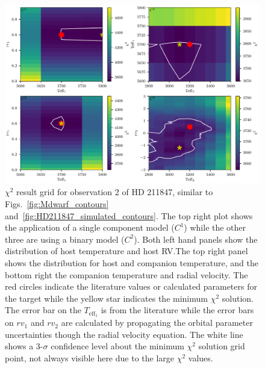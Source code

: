 \documentclass[fleqn,usenatbib]{mnras}
\begin{document}
\begin{figure}
    \centering
    \includegraphics[width=0.8\hsize]{images/fig5.pdf}
    \caption{\(\chi^2\) result grid for observation 2 of {HD 211847}, similar to Figs.~\ref{fig:Mdwarf_contours} and~\ref{fig:HD211847_simulated_contours}. The top right plot shows the application of a single component model (\(C^1\)) while the other three are using a binary model (\(C^2\)). Both left hand panels show the distribution of host temperature and host RV.\@ The top right panel shows the distribution for host and companion temperature, and the bottom right the companion temperature and radial velocity. The red circles indicate the literature values or calculated parameters for the target while the yellow star indicates the minimum \(\chi^2\) solution. The error bar on the \(T_{\textrm{eff}_1}\) is from the literature while the error bars on \({rv}_1\) and \({rv}_2\) are calculated by propagating the orbital parameter uncertainties though the radial velocity equation. The white line shows a 3-\(\sigma\) confidence level about the minimum \(\chi^2\) solution grid point, not always visible here due to the large \(\chi^2\) values.}
    \label{fig:HD211847_result_contours}
\end{figure}
\end{document}
